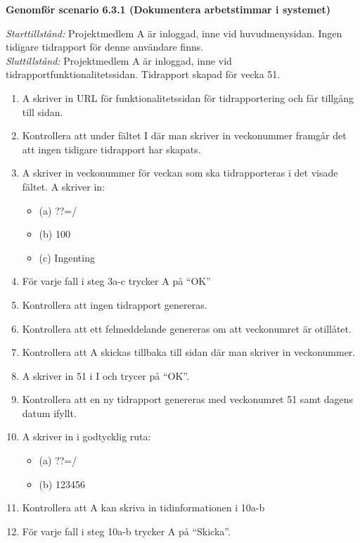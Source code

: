 \documentclass[a4paper]{article}
\begin{document}
\begin{ST}




\item
\textbf{Genomför scenario 6.3.1 (Dokumentera arbetstimmar i systemet)}

\emph{Starttillstånd:} Projektmedlem A är inloggad, inne vid huvudmenysidan. Ingen tidigare tidrapport för denne användare finns.\\
\emph{Sluttillstånd:} Projektmedlem A är inloggad, inne vid tidrapportfunktionalitetssidan. Tidrapport skapad för vecka 51.\\

\begin{enumerate}
\item A skriver in URL för funktionalitetssidan för tidrapportering och får tillgång till sidan.
\item Kontrollera att under fältet I där man skriver in veckonummer framgår det att ingen tidigare tidrapport har skapats.
\item A skriver in veckonummer för veckan som ska tidrapporteras i det visade fältet. A skriver in:
\begin{itemize}
\item[] (a) ??=/
\item[] (b) 100
\item[] (c) Ingenting
\end{itemize}
\item För varje fall i steg 3a-c trycker A på ``OK''
\item Kontrollera att ingen tidrapport genereras.
\item Kontrollera att ett felmeddelande genereras om att veckonumret är otillåtet.
\item Kontrollera att A skickas tillbaka till sidan där man skriver in veckonummer.
\item A skriver in 51 i I och trycer på ``OK''.
\item Kontrollera att en ny tidrapport genereras med veckonumret 51 samt dagens datum ifyllt.
\item A skriver in i godtycklig ruta:
\begin{itemize}
\item[] (a) ??=/
\item[] (b) 123456
\end{itemize}
\item Kontrollera att A kan skriva in tidinformationen i 10a-b
\item För varje fall i steg 10a-b trycker A på ``Skicka''. 

\end{enumerate}
\end{ST}
\end{document}
